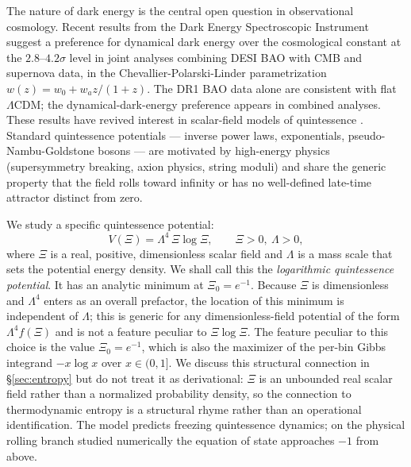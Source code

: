 \documentclass[11pt,reqno]{amsart}
\theoremstyle{plain}
\theoremstyle{definition}
\theoremstyle{remark}
\begin{document}
The nature of dark energy is the central open question in observational
cosmology. Recent results from the Dark Energy Spectroscopic Instrument
\cite{DESI2024BAO,DESI2024VI} suggest a preference for dynamical dark energy
over the cosmological constant at the $2.8$--$4.2\sigma$ level in joint
analyses combining DESI BAO with CMB and supernova data, in the
Chevallier-Polarski-Linder \cite{CPL2001} parametrization
$w(z) = w_0 + w_a z/(1+z)$. The DR1 BAO data alone are consistent with flat
$\Lambda$CDM; the dynamical-dark-energy preference appears in combined
analyses. These results have revived interest in scalar-field models of
quintessence \cite{RatraPeebles1988,Wetterich1988,Frieman1995}. Standard
quintessence potentials --- inverse power laws, exponentials,
pseudo-Nambu-Goldstone bosons --- are motivated by high-energy physics
(supersymmetry breaking, axion physics, string moduli) and share the
generic property that the field rolls toward infinity or has no
well-defined late-time attractor distinct from zero.

We study a specific quintessence potential:
\begin{equation}\label{eq:Vxi}
  V(\Xi) = \Lambda^{4}\,\Xi\log\Xi,
  \qquad \Xi > 0,\ \Lambda > 0,
\end{equation}
where $\Xi$ is a real, positive, dimensionless scalar field and $\Lambda$ is
a mass scale that sets the potential energy density. We shall call this the
\emph{logarithmic quintessence potential}. It has an analytic minimum at
$\Xi_0 = e^{-1}$. Because $\Xi$ is dimensionless and $\Lambda^{4}$ enters
as an overall prefactor, the location of this minimum is independent of
$\Lambda$; this is generic for any dimensionless-field potential of the
form $\Lambda^{4} f(\Xi)$ and is not a feature peculiar to $\Xi\log\Xi$.
The feature peculiar to this choice is the value $\Xi_0 = e^{-1}$, which
is also the maximizer of the per-bin Gibbs integrand $-x\log x$ over
$x \in (0,1]$. We discuss this structural connection in
\S\ref{sec:entropy} but do not treat it as derivational: $\Xi$ is an
unbounded real scalar field rather than a normalized probability density,
so the connection to thermodynamic entropy is a structural rhyme rather
than an operational identification. The model predicts freezing
quintessence dynamics; on the physical rolling branch studied numerically
the equation of state approaches $-1$ from above.
\end{document}
